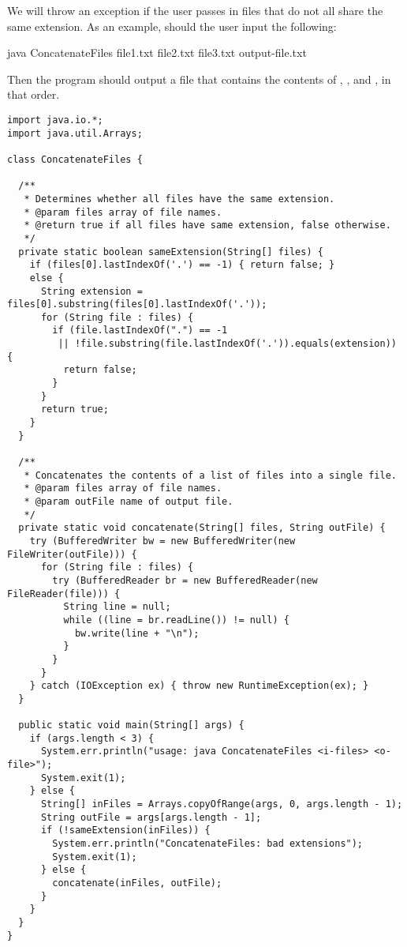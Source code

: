 We will throw an exception if the user passes in files that do not all share the same extension. As an example, should the user input the following:

\begin{verbnobox}[\small]
java ConcatenateFiles file1.txt file2.txt file3.txt output-file.txt
\end{verbnobox}

Then the program should output a file  that contains the contents of , , and , in that order. 

\newpage %
\begin{lstlisting}[language=MyJava]
import java.io.*;
import java.util.Arrays;

class ConcatenateFiles {
 
  /**
   * Determines whether all files have the same extension.
   * @param files array of file names.
   * @return true if all files have same extension, false otherwise.
   */
  private static boolean sameExtension(String[] files) {
    if (files[0].lastIndexOf('.') == -1) { return false; } 
    else {
      String extension = files[0].substring(files[0].lastIndexOf('.'));
      for (String file : files) {
        if (file.lastIndexOf(".") == -1 
         || !file.substring(file.lastIndexOf('.')).equals(extension)) { 
          return false; 
        }
      }
      return true;
    }
  }

  /**
   * Concatenates the contents of a list of files into a single file.
   * @param files array of file names.
   * @param outFile name of output file.
   */
  private static void concatenate(String[] files, String outFile) {
    try (BufferedWriter bw = new BufferedWriter(new FileWriter(outFile))) {
      for (String file : files) {
        try (BufferedReader br = new BufferedReader(new FileReader(file))) {
          String line = null;
          while ((line = br.readLine()) != null) { 
            bw.write(line + "\n"); 
          }
        }
      }
    } catch (IOException ex) { throw new RuntimeException(ex); }
  }

  public static void main(String[] args) {
    if (args.length < 3) {
      System.err.println("usage: java ConcatenateFiles <i-files> <o-file>");
      System.exit(1);
    } else {
      String[] inFiles = Arrays.copyOfRange(args, 0, args.length - 1);
      String outFile = args[args.length - 1];
      if (!sameExtension(inFiles)) {
        System.err.println("ConcatenateFiles: bad extensions");
        System.exit(1);
      } else {
        concatenate(inFiles, outFile);
      }
    }
  }
}
\end{lstlisting}


